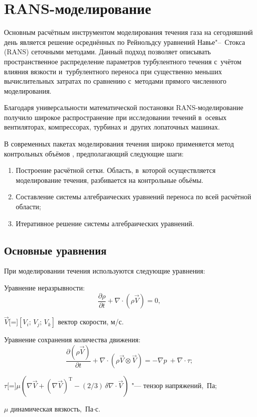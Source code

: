\section{RANS-моделирование}\label{sec:cfd}

Основным расчётным инструментом моделирования течения газа на сегодняшний день является решение осреднённых по Рейнольдсу уравнений Навье"--~Стокса (RANS) сеточными методами.
Данный подход позволяет описывать пространственное распределение параметров турбулентного течения с~учётом влияния вязкости и~турбулентного переноса при существенно меньших вычислительных затратах по сравнению с~методами прямого численного моделирования.

Благодаря универсальности математической постановки RANS-моделирование получило широкое распространение при исследовании течений в~осевых вентиляторах, компрессорах, турбинах и~других лопаточных машинах.

В современных пакетах моделирования течения широко применяется метод контрольных объёмов \autocite{Versteeg1995}, предполагающий следующие шаги:
\begin{enumerate}
	\item Построение расчётной сетки.
	Область, в~которой осуществляется моделирование течения, разбивается на контрольные объёмы.
	\item Составление системы алгебраических уравнений переноса по всей расчётной области;
	\item Итеративное решение системы алгебраических уравнений.
\end{enumerate}

\subsection{Основные уравнения}
При моделировании течения используются следующие уравнения:

Уравнение неразрывности:
\begin{equation}
	\frac{\partial\rho}{\partial t}+\nabla \cdot (\rho \vec{V}) = 0,
\end{equation}
\begin{eqexpl}
	\item{\(\vec{V}\)}[=]\(\left[V_i; \, V_j; \, V_k\right]\) вектор скорости, м/с.
\end{eqexpl}

Уравнение сохранения количества движения:
\begin{equation}
	\frac{\partial(\rho\vec{V})}{\partial t}+\nabla\cdot (\rho\vec{V}\otimes\vec{V}) = -\nabla p~+ \nabla \cdot \tau;
	\label{eq:continum}
\end{equation}
\begin{eqexpl}
	\item{\(\tau\)}[=]\(\mu\left(\nabla\vec{V} +(\nabla\vec{V})^{\text{T}} - (2/3)\,\delta\nabla\cdot\vec{V}\right)\) "--- тензор напряжений,~Па;
	\item{\(\mu\)} динамическая вязкость,~Па$\cdot$с.
\end{eqexpl}

